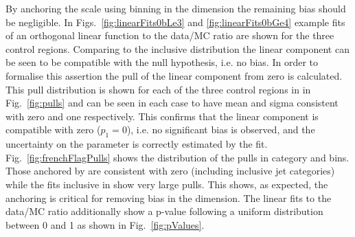 By anchoring the scale using binning in the \scalht dimension the remaining
bias should be negligible. In Figs.~\ref{fig:linearFits0bLe3} and \ref{fig:linearFits0bGe4} 
example fits of an orthogonal linear function to the data/MC ratio 
are shown for the three control regions. Comparing to the inclusive distribution 
the linear component can be seen to be compatible with the null hypothesis, 
i.e. no bias. In order to formalise this assertion 
the pull of the linear component from zero is calculated.
This pull distribution is shown for each of the three control regions in
in Fig.~\ref{fig:pulls} and can be seen in each case to have mean and sigma
consistent with zero and one respectively. This confirms that the linear component 
is compatible with zero ($p_1 = 0$), i.e. no significant bias is observed, 
and the uncertainty on the parameter is correctly estimated by the fit.
Fig.~\ref{fig:frenchFlagPulls} shows the distribution of the pulls 
in category and \scalht bins. Those anchored by \scalht are consistent
with zero (including inclusive jet categories) while the fits inclusive in \scalht
show very large pulls. This shows, as expected, the \scalht anchoring
is critical for removing bias in the \mht dimension. The linear fits to the
data/MC ratio additionally show a p-value following 
a uniform distribution between 0 and 1 as shown in Fig.~\ref{fig:pValues}.


